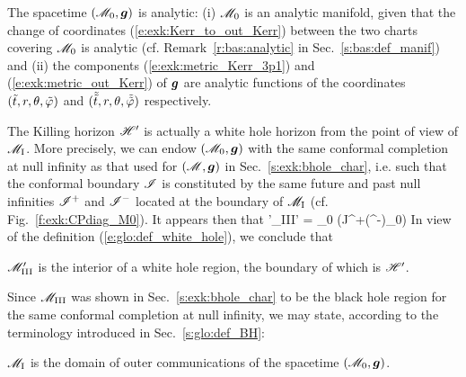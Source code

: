 \begin{remark} \label{r:exk:M0_analytic}
The spacetime $(\mathscr{M}_0,\bm{g})$ is analytic: (i) $\mathscr{M}_0$ is an analytic manifold,
given that the change of coordinates (\ref{e:exk:Kerr_to_out_Kerr})
between the two charts covering $\mathscr{M}_0$ is analytic
(cf. Remark~\ref{r:bas:analytic} in Sec.~\ref{s:bas:def_manif})
and (ii) the components (\ref{e:exk:metric_Kerr_3p1}) and (\ref{e:exk:metric_out_Kerr})
of $\bm{g}$ are analytic functions of the
coordinates $({\tilde t}, r, \theta, {\tilde\varphi})$ and $(\tilde{{\tilde t}}, r, \theta, \tilde{{\tilde\varphi}})$
respectively.
\end{remark}


The Killing horizon $\mathscr{H}'$ is actually a white hole horizon from the point
of view of $\mathscr{M}_{\rm I}$. More precisely, we can endow $(\mathscr{M}_0,\bm{g})$ with the same conformal
completion at null infinity as that used for $(\mathscr{M},\bm{g})$ in Sec.~\ref{s:exk:bhole_char},
i.e. such that the conformal boundary $\mathscr{I}$ is constituted by
the same future and past null infinities
$\mathscr{I}^+$ and $\mathscr{I}^-$ located at the boundary of $\mathscr{M}_{\rm I}$ (cf. Fig.~\ref{f:exk:CPdiag_M0}).
It appears then that
\be
   \M'_{\rm III}\cup \Hor' = \M_0 \setminus (J^+(\scri^-)\cap \M_0)
\ee
In view of the definition (\ref{e:glo:def_white_hole}), we conclude that
\begin{greybox}
$\mathscr{M}'_{\rm III}$ is the interior of a white hole region, the boundary of which
is $\mathscr{H}'$.
\end{greybox}

Since $\mathscr{M}_{\rm III}$ was shown in Sec.~\ref{s:exk:bhole_char} to be the black hole region for
the same conformal completion at null infinity, we may state,
according to the terminology introduced in Sec.~\ref{s:glo:def_BH}:
\begin{greybox}
$\mathscr{M}_{\rm I}$ is the domain of outer communications
of the spacetime $(\mathscr{M}_0,\bm{g})$.
\end{greybox}


